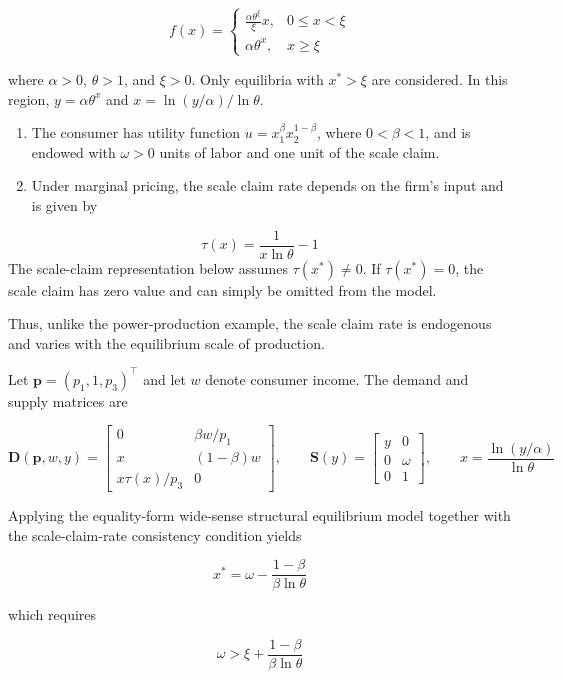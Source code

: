\documentclass[
  letterpaper,
  DIV=11,
  numbers=noendperiod]{scrreprt}
\begin{document}
\[
f(x)=
\begin{cases}
\frac{\alpha\theta^\xi}{\xi}x,&0\leq x<\xi\\[4pt]
\alpha\theta^x,&x\geq\xi
\end{cases}
\]

where \(\alpha>0\), \(\theta>1\), and \(\xi>0\). Only equilibria with
\(x^*>\xi\) are considered. In this region, \(y=\alpha\theta^x\) and
\(x=\ln(y/\alpha)/\ln\theta\).

\begin{enumerate}
\def\labelenumi{\arabic{enumi}.}
\setcounter{enumi}{2}
\item
  The consumer has utility function \(u=x_1^\beta x_2^{1-\beta}\), where
  \(0<\beta<1\), and is endowed with \(\omega>0\) units of labor and one
  unit of the scale claim.
\item
  Under marginal pricing, the scale claim rate depends on the firm's
  input and is given by
\end{enumerate}

\[
\tau(x)=\frac{1}{x\ln\theta}-1
\] The scale-claim representation below assumes \(\tau(x^*)\ne0\). If
\(\tau(x^*)=0\), the scale claim has zero value and can simply be
omitted from the model.

Thus, unlike the power-production example, the scale claim rate is
endogenous and varies with the equilibrium scale of production.

Let \(\mathbf p=(p_1,1,p_3)^\top\) and let \(w\) denote consumer income.
The demand and supply matrices are

\[
\mathbf D(\mathbf p,w,y)=
\begin{bmatrix}
0&\beta w/p_1\\
x&(1-\beta)w\\
x\tau(x)/p_3&0
\end{bmatrix},
\qquad
\mathbf S(y)=
\begin{bmatrix}
y&0\\
0&\omega\\
0&1
\end{bmatrix},
\qquad
x=\frac{\ln(y/\alpha)}{\ln\theta}
\]

Applying the equality-form wide-sense structural equilibrium model
together with the scale-claim-rate consistency condition yields

\[
x^*=
\omega-\frac{1-\beta}{\beta\ln\theta}
\]

which requires

\[
\omega>
\xi+\frac{1-\beta}{\beta\ln\theta}
\]
\end{document}
